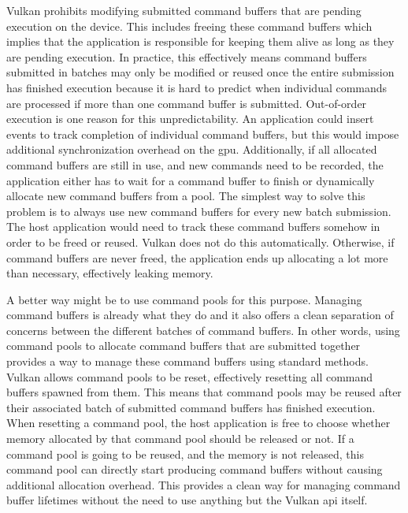 
        Vulkan prohibits modifying submitted command buffers that are pending execution on the device.
        This includes freeing these command buffers which implies that the application is responsible for keeping them alive as long as they are pending execution.
        In practice, this effectively means command buffers submitted in batches may only be modified or reused once the entire submission has finished execution because it is hard to predict when individual commands are processed if more than one command buffer is submitted.
        Out-of-order execution is one reason for this unpredictability.
        An application could insert events to track completion of individual command buffers, but this would impose additional synchronization overhead on the \gls{gpu}.
        Additionally, if all allocated command buffers are still in use, and new commands need to be recorded, the application either has to wait for a command buffer to finish or dynamically allocate new command buffers from a pool.
        The simplest way to solve this problem is to always use new command buffers for every new batch submission.
        The host application would need to track these command buffers somehow in order to be freed or reused.
        Vulkan does not do this automatically.
        Otherwise, if command buffers are never freed, the application ends up allocating a lot more than necessary, effectively leaking memory.

        A better way might be to use command pools for this purpose.
        Managing command buffers is already what they do and it also offers a clean separation of concerns between the different batches of command buffers.
        In other words, using command pools to allocate command buffers that are submitted together provides a way to manage these command buffers using standard methods.
        Vulkan allows command pools to be reset, effectively resetting all command buffers spawned from them.
        This means that command pools may be reused after their associated batch of submitted command buffers has finished execution.
        When resetting a command pool, the host application is free to choose whether memory allocated by that command pool should be released or not.
        If a command pool is going to be reused, and the memory is not released, this command pool can directly start producing command buffers without causing additional allocation overhead.
        This provides a clean way for managing command buffer lifetimes without the need to use anything but the Vulkan \gls{api} itself.

